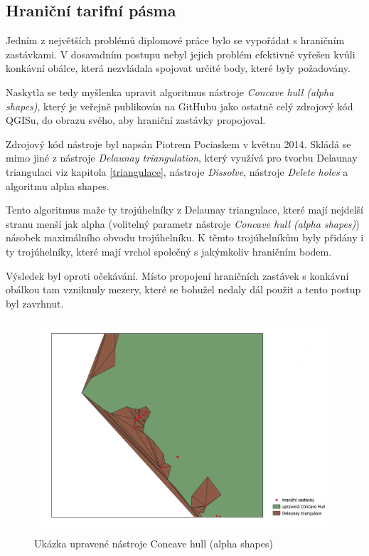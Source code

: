 \subsection{Hraniční tarifní pásma}
\label{hranice}

Jedním z největších problémů diplomové práce bylo se vypořádat s hraničním zastávkami.
V dosavadním postupu nebyl jejich problém efektivně vyřešen kvůli konkávní obálce,
která nezvládala spojovat určité body, které byly požadovány.

Naskytla se tedy myšlenka upravit algoritmus nástroje \textit{Concave hull (alpha shapes)},
který je veřejně publikován na GitHubu jako ostatně celý zdrojový kód QGISu, do obrazu
svého, aby hraniční zastávky propojoval. 

Zdrojový kód nástroje byl napsán Piotrem Pociaskem v květnu 2014. Skládá se mimo jiné z nástroje
\textit{Delaunay triangulation}, který využívá pro tvorbu Delaunay triangulaci viz kapitola \ref{triangulace},
nástroje \textit{Dissolve}, nástroje \textit{Delete holes} a algoritmu alpha shapes.

Tento algoritmus maže ty trojúhelníky z Delaunay triangulace, které mají nejdelší stranu menší jak alpha (volitelný
parametr nástroje \textit{Concave hull (alpha shapes)}) násobek maximálního obvodu trojúhelníku.
K těmto trojúhelníkům byly přidány i ty trojúhelníky, které mají vrchol společný s jakýmkoliv hraničním bodem.

Výsledek byl oproti očekávání. Místo propojení hraničních zastávek s konkávní obálkou tam vzniknuly mezery, 
které se bohužel nedaly dál použit a tento postup byl zavrhnut.

\begin{figure}[H] \centering
    \includegraphics[width=400pt]{./pictures/concave_hull_upravena.png}
    \caption[Ukázka upravené nástroje Concave hull (alpha shapes)]{Ukázka upravené nástroje Concave hull (alpha shapes)}
	\label{fig:concave_hull_upravena}              
\end{figure}


